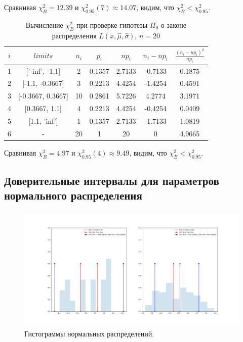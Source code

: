 \documentclass[../main.tex]{subfiles}
\begin{document}
    \noindent Сравнивая $\chi^{2}_{B} = 12.39$ и $\chi^{2}_{0.95}(7) \approx 14.07$, видим, что $\chi^{2}_{B} < \chi^{2}_{0.95}$.
    \\
    
    \begin{table}[H]
    	\centering
    	\begin{tabular}{| c | c | c | c | c | c | c |}
    		\hline
    		$i$ & $limits$         &   $n_i$ &    $p_i$ &   $np_i$ &   $n_i - np_i$ &   $\frac{(n_i-np_i)^2}{np_i}$ \\
            \hline
                1 & ['-inf', -1.1]    &  2 & 0.1357 &  2.7133 & -0.7133 & 0.1875 \\
                2 & [-1.1, -0.3667]   &  3 & 0.2213 &  4.4254 & -1.4254 & 0.4591 \\
                3 & [-0.3667, 0.3667] & 10 & 0.2861 &  5.7226 &  4.2774 & 3.1971 \\
                4 & [0.3667, 1.1]     &  4 & 0.2213 &  4.4254 & -0.4254 & 0.0409 \\
                5 & [1.1, 'inf']      &  1 & 0.1357 &  2.7133 & -1.7133 & 1.0819 \\
                6 & -                 & 20 & 1      & 20      &  0      & 4.9665 \\
            \hline
    	\end{tabular}
    	\caption{ Вычисление $\chi^{2}_{B}$ при проверке гипотезы $H_{0}$ о законе распределения $L(x,\hat{\mu}, \hat{\sigma})$, $n=20$}
    	\label{tab:laplace_chi_2}
    \end{table}
    
    \noindent Сравнивая $\chi^{2}_{B} =  4.97$ и $\chi^{2}_{0.95}(4) \approx 9.49$, видим, что $\chi^{2}_{B} < \chi^{2}_{0.95}$.
    \\
    
    \subsection{Доверительные интервалы для параметров нормального распределения}
    \begin{figure}[H]
		\centering
		    \includegraphics[width = 20cm, height = 6cm]{figures/1.png}
		\caption{Гистограммы нормальных распределений.}
		\label{w_pert}
	\end{figure}
    
\end{document}
